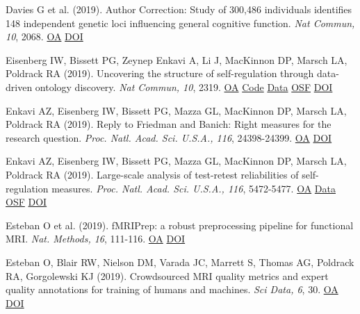 Davies G et al. (2019). Author Correction: Study of 300,486 individuals identifies 148 independent genetic loci influencing general cognitive function. \textit{Nat Commun, 10}, 2068. \href{https://www.ncbi.nlm.nih.gov/pmc/articles/PMC6494826}{OA} \href{http://dx.doi.org/10.1038/s41467-019-10160-w}{DOI} \vspace{2mm}

Eisenberg IW, Bissett PG, Zeynep Enkavi A, Li J, MacKinnon DP, Marsch LA, Poldrack RA (2019). Uncovering the structure of self-regulation through data-driven ontology discovery. \textit{Nat Commun, 10}, 2319. \href{https://www.ncbi.nlm.nih.gov/pmc/articles/PMC6534563}{OA} \href{https://github.com/IanEisenberg/Self\_Regulation\_Ontology}{Code} \href{https://github.com/IanEisenberg/Self\_Regulation\_Ontology/tree/master/Data}{Data} \href{https://osf.io/zk6w9/}{OSF} \href{http://dx.doi.org/10.1038/s41467-019-10301-1}{DOI} \vspace{2mm}

Enkavi AZ, Eisenberg IW, Bissett PG, Mazza GL, MacKinnon DP, Marsch LA, Poldrack RA (2019). Reply to Friedman and Banich: Right measures for the research question. \textit{Proc. Natl. Acad. Sci. U.S.A., 116}, 24398-24399. \href{https://www.ncbi.nlm.nih.gov/pmc/articles/PMC6900533}{OA} \href{http://dx.doi.org/10.1073/pnas.1917123116}{DOI} \vspace{2mm}

Enkavi AZ, Eisenberg IW, Bissett PG, Mazza GL, MacKinnon DP, Marsch LA, Poldrack RA (2019). Large-scale analysis of test-retest reliabilities of self-regulation measures. \textit{Proc. Natl. Acad. Sci. U.S.A., 116}, 5472-5477. \href{https://www.ncbi.nlm.nih.gov/pmc/articles/PMC6431228}{OA} \href{https://github.com/IanEisenberg/Self\_Regulation\_Ontology/tree/master/Data}{Data} \href{https://osf.io/5mjns/}{OSF} \href{http://dx.doi.org/10.1073/pnas.1818430116}{DOI} \vspace{2mm}

Esteban O et al. (2019). fMRIPrep: a robust preprocessing pipeline for functional MRI. \textit{Nat. Methods, 16}, 111-116. \href{https://www.ncbi.nlm.nih.gov/pmc/articles/PMC6319393}{OA} \href{http://dx.doi.org/10.1038/s41592-018-0235-4}{DOI} \vspace{2mm}

Esteban O, Blair RW, Nielson DM, Varada JC, Marrett S, Thomas AG, Poldrack RA, Gorgolewski KJ (2019). Crowdsourced MRI quality metrics and expert quality annotations for training of humans and machines. \textit{Sci Data, 6}, 30. \href{https://www.ncbi.nlm.nih.gov/pmc/articles/PMC6472378}{OA} \href{http://dx.doi.org/10.1038/s41597-019-0035-4}{DOI} \vspace{2mm}

